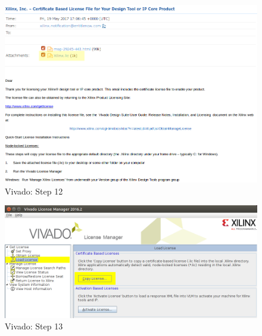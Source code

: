 \begin{figure}
    \centering
    \includegraphics[width=1\textwidth]{images/devguide/vivado-install-17.png}
    \caption[Vivado: Step 12]{%
        Vivado: Step 12
    }
    \label{fig:devguide:vivado}
\end{figure}

\begin{figure}
    \centering
    \includegraphics[width=1\textwidth]{images/devguide/vivado-install-18.png}
    \caption[Vivado: Step 13]{%
        Vivado: Step 13
    }
    \label{fig:devguide:vivado}
\end{figure}

